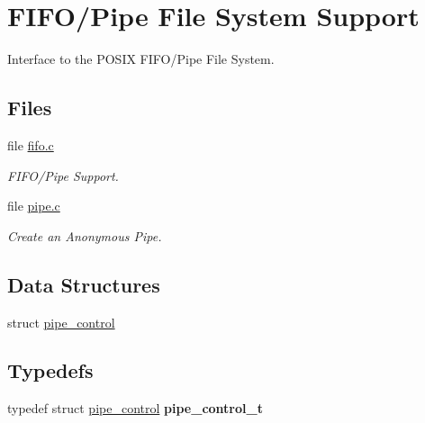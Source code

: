 \hypertarget{group__FIFO__PIPE}{}\section{F\+I\+F\+O/\+Pipe File System Support}
\label{group__FIFO__PIPE}


Interface to the P\+O\+S\+IX F\+I\+F\+O/\+Pipe File System.  


\subsection*{Files}
\begin{DoxyCompactItemize}
\item 
file \mbox{\hyperlink{fifo_8c}{fifo.\+c}}
\begin{DoxyCompactList}\small\item\em F\+I\+F\+O/\+Pipe Support. \end{DoxyCompactList}\item 
file \mbox{\hyperlink{pipe_8c}{pipe.\+c}}
\begin{DoxyCompactList}\small\item\em Create an Anonymous Pipe. \end{DoxyCompactList}\end{DoxyCompactItemize}
\subsection*{Data Structures}
\begin{DoxyCompactItemize}
\item 
struct \mbox{\hyperlink{structpipe__control}{pipe\+\_\+control}}
\end{DoxyCompactItemize}
\subsection*{Typedefs}
\begin{DoxyCompactItemize}
\item 
\mbox{\label{group__FIFO__PIPE_gacbca1a97159b267819012ee31b73722d}} 
typedef struct \mbox{\hyperlink{structpipe__control}{pipe\+\_\+control}} {\bfseries pipe\+\_\+control\+\_\+t}
\end{DoxyCompactItemize}
